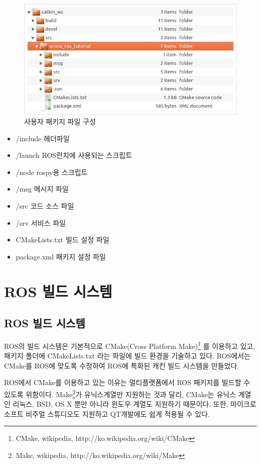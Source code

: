 \begin{figure}[h]
\centering\includegraphics[width=0.5\columnwidth]{pictures/chapter4/folder_oroca_ros_tutorial.jpg}
\caption{사용자 패키지 파일 구성}
\end{figure}

\begin{itemize}
\item /include 헤더파일
\item /launch ROS런치에 사용되는 스크립트
\item /node rospy용 스크립트
\item /msg 메시지 파일
\item /src 코드 소스 파일
\item /srv 서비스 파일
\item CMakeLists.txt 빌드 설정 파일
\item package.xml 패키지 설정 파일
\end{itemize}

\section{ROS 빌드 시스템}

\subsection{ROS 빌드 시스템}

ROS의 빌드 시스템은 기본적으로 CMake(Cross Platform Make)\footnote{CMake, wikipedia, http://ko.wikipedia.org/wiki/CMake} 를 이용하고 있고, 패키지 폴더에 CMakeLists.txt 라는 파일에 빌드 환경을 기술하고 있다. ROS에서는 CMake를 ROS에 맞도록 수정하여 ROS에 특화된 캐킨 빌드 시스템을 만들었다. 

ROS에서 CMake를 이용하고 있는 이유는 멀티플랫폼에서 ROS 패키지를 빌드할 수 있도록 위함이다. Make\footnote{Make, wikipedia, http://ko.wikipedia.org/wiki/Make}가 유닉스계열만 지원하는 것과 달리, CMake는 유닉스 계열인 리눅스, BSD, OS X 뿐만 아니라 윈도우 계열도 지원하기 때문이다. 또한, 마이크로소프트 비주얼 스튜디오도 지원하고 QT개발에도 쉽게 적용될 수 있다. 


